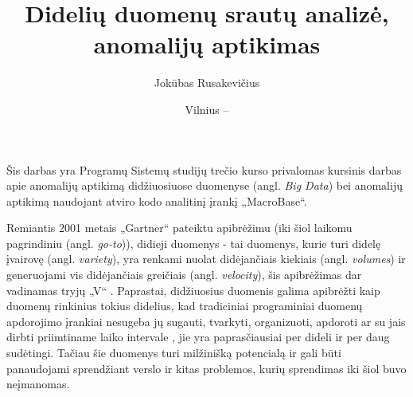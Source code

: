 \documentclass{VUMIFPSkursinis}
\title{Didelių duomenų srautų analizė, anomalijų aptikimas}
\author{Jokūbas Rusakevičius}
\date{Vilnius – \the\year}
\begin{document}
\maketitle

\tableofcontents

Šis darbas yra Programų Sistemų studijų trečio kurso privalomas kursinis darbas apie anomalijų aptikimą didžiuosiuose duomenyse (angl. \textit{Big Data}) bei anomalijų aptikimą naudojant atviro kodo analitinį įrankį „MacroBase“.

Remiantis 2001 metais „Gartner“ pateiktu apibrėžimu (iki šiol laikomu pagrindiniu (angl. \textit{go-to})), didieji duomenys - tai duomenys, kurie turi didelę įvairovę (angl. \textit{variety}), yra renkami nuolat didėjančiais kiekiais (angl. \textit{volumes}) ir generuojami vis didėjančiais greičiais (angl. \textit{velocity}), šis apibrėžimas dar vadinamas tryjų „V“ \cite{three_vs}. Paprastai, didžiuosius duomenis galima apibrėžti kaip duomenų rinkinius tokius didelius, kad tradiciniai programiniai duomenų apdorojimo įrankiai nesugeba jų sugauti, tvarkyti, organizuoti, apdoroti ar su jais dirbti priimtiname laiko intervale \cite{bigdata_tolerable_time}, jie yra paprasčiausiai per dideli ir per daug sudėtingi. Tačiau šie duomenys turi milžinišką potencialą ir gali būti panaudojami sprendžiant verslo ir kitas problemos, kurių sprendimas iki šiol buvo neįmanomas.\par
\end{document}
